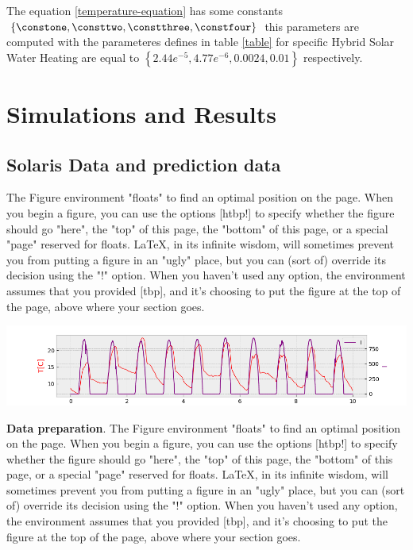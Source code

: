 The equation \ref{temperature-equation} has some constants $\left\lbrace 
\constone, \consttwo, \constthree, \constfour \right\rbrace $ this
parameters are computed with the parameteres defines in table \ref{table} for specific Hybrid Solar Water Heating
are equal to $\left\lbrace 2.44e^{-5},  4.77e^{-6}
, 0.0024, 0.01  \right\rbrace$ respectively.


\section{Simulations and Results}

\subsection{Solaris Data and prediction data}
The Figure environment "floats" to find an optimal position on the page. When you begin a figure, you can use the options [htbp!] to specify whether the figure should go "here", the "top" of this page, the "bottom" of this page, or a special "page" reserved for floats. LaTeX, in its infinite wisdom, will sometimes prevent you from putting a figure in an "ugly" place, but you can (sort of) override its decision using the "!" option. When you haven't used any option, the environment assumes that you provided [tbp], and it's choosing to put the figure at the top of the page, above where your section goes.

\begin{minipage}{\linewidth}
    \begin{center}  
        \includegraphics[width=1.2\linewidth]{images/solaris2}
    \end{center}
\end{minipage}

\textbf{Data preparation}.
The Figure environment "floats" to find an optimal position on the page. When you begin a figure, you can use the options [htbp!] to specify whether the figure should go "here", the "top" of this page, the "bottom" of this page, or a special "page" reserved for floats. LaTeX, in its infinite wisdom, will sometimes prevent you from putting a figure in an "ugly" place, but you can (sort of) override its decision using the "!" option. When you haven't used any option, the environment assumes that you provided [tbp], and it's choosing to put the figure at the top of the page, above where your section goes.

